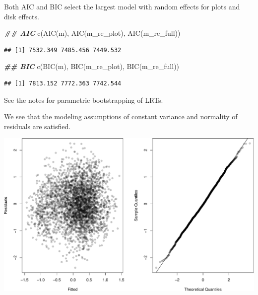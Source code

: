 \documentclass[
  ignorenonframetext,
]{beamer}
\newenvironment{Shaded}{\begin{snugshade}}{\end{snugshade}}
\newcommand{\DocumentationTok}[1]{\textcolor[rgb]{0.56,0.35,0.01}{\textbf{\textit{#1}}}}
\newcommand{\FunctionTok}[1]{\textcolor[rgb]{0.00,0.00,0.00}{#1}}
\newcommand{\NormalTok}[1]{#1}
\begin{document}
\begin{frame}[fragile]{}
\protect\hypertarget{section-15}{}
Both AIC and BIC select the largest model with random effects for plots
and disk effects.

\vspace{12pt}
\small

\begin{Shaded}
\begin{Highlighting}[]
\DocumentationTok{\#\# AIC}
\FunctionTok{c}\NormalTok{(}\FunctionTok{AIC}\NormalTok{(m), }\FunctionTok{AIC}\NormalTok{(m\_re\_plot), }\FunctionTok{AIC}\NormalTok{(m\_re\_full))}
\end{Highlighting}
\end{Shaded}

\begin{verbatim}
## [1] 7532.349 7485.456 7449.532
\end{verbatim}

\begin{Shaded}
\begin{Highlighting}[]
\DocumentationTok{\#\# BIC}
\FunctionTok{c}\NormalTok{(}\FunctionTok{BIC}\NormalTok{(m), }\FunctionTok{BIC}\NormalTok{(m\_re\_plot), }\FunctionTok{BIC}\NormalTok{(m\_re\_full))  }
\end{Highlighting}
\end{Shaded}

\begin{verbatim}
## [1] 7813.152 7772.363 7742.544
\end{verbatim}

\vspace{12pt}
\normalsize

See the notes for parametric bootstrapping of LRTs.
\end{frame}

\begin{frame}{}
\protect\hypertarget{section-16}{}
We see that the modeling assumptions of constant variance and normality
of residuals are satisfied.

\vspace{12pt}

\includegraphics{week11p1_files/figure-beamer/unnamed-chunk-14-1.pdf}
\end{frame}
\end{document}
